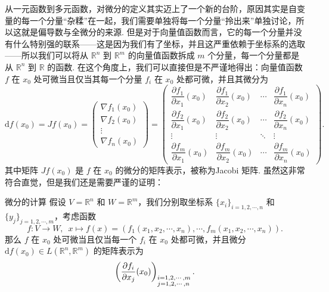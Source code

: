 从一元函数到多元函数，对微分的定义其实迈上了一个新的台阶，原因其实是自变量的每一个分量“杂糅”在一起，我们需要单独将每一个分量“拎出来”单独讨论，所以这就是偏导数与全微分的来源. 但是对于向量值函数而言，它的每一个分量并没有什么特别强的联系——这是因为我们有了坐标，并且这严重依赖于坐标系的选取——所以我们可以将从 $\mathbb{R}^n$ 到 $\mathbb{R}^m$ 的向量值函数拆成 $m$ 个分量，每一个分量都是从 $\mathbb{R}^n$ 到 $\mathbb{R}$ 的函数. 在这个角度上，我们可以直接但是不严谨地得出：向量值函数 $f$ 在 $x_0$ 处可微当且仅当其每一个分量 $f_i$ 在 $x_0$ 处都可微，并且其微分为
\[
    \mathrm{d}f(x_0) = Jf(x_0) =
    \begin{pmatrix} \nabla f_1(x_0) \\ \nabla f_2(x_0) \\ \vdots \\ \nabla f_n(x_0) \end{pmatrix} =
    \begin{pmatrix}
        \dfrac{\partial f_1}{\partial x_1}(x_0) &\dfrac{\partial f_1}{\partial x_2}(x_0) & \cdots & \dfrac{\partial f_1}{\partial x_n}(x_0) \\
        \dfrac{\partial f_2}{\partial x_1}(x_0) & \dfrac{\partial f_2}{\partial x_2}(x_0) & \cdots & \dfrac{\partial f_2}{\partial x_n}(x_0) \\
        \vdots & \vdots & \ddots & \vdots \\
        \dfrac{\partial f_m}{\partial x_1}(x_0) & \dfrac{\partial f_m}{\partial x_2}(x_0) & \cdots & \dfrac{\partial f_m}{\partial x_n}(x_0)
    \end{pmatrix}.
\]
其中矩阵 $Jf(x_0)$ 是 $f$ 在 $x_0$ 的微分的矩阵表示，被称为\textrm{Jacobi 矩阵}. 虽然这非常符合直觉，但是我们还是需要严谨的证明：

\begin{theorem}{微分的计算}{}
    假设 $V = \mathbb{R}^n$ 和 $W = \mathbb{R}^m$，我们分别取坐标系 $\{x_i\}_{i = 1, 2, \cdots, n}$ 和 $\{y_j\}_{j = 1, 2, \cdots, m}$，考虑函数 \[f: V\to W,\enspace x\mapsto f(x) = (f_1(x_1, x_2, \cdots, x_n), \cdots, f_m(x_1, x_2, \cdots, x_n)).\]
    那么 $f$ 在 $x_0$ 处可微当且仅当每一个 $f_i$ 在 $x_0$ 处都可微，并且微分 $\mathrm{d}f(x_0)\in L(\mathbb{R}^n, \mathbb{R}^m)$ 的矩阵表示为
    \[\left(\frac{\partial f_i}{\partial x_j}(x_0)\right)_{\begin{subarray}  \enspace i = 1, 2, \cdots, m \\ j = 1, 2, \cdots, n\end{subarray}}.\]
\end{theorem}

